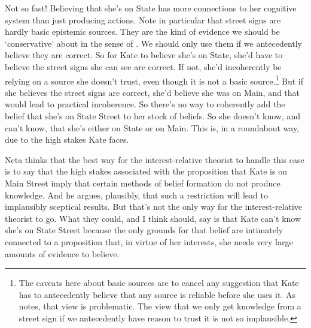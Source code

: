 Not so fast! Believing that she's on State has more connections to her cognitive system than just producing actions. Note in particular that street signs are hardly basic epistemic sources. They are the kind of evidence we should be `conservative' about in the sense of \citet{Pryor2004-PRYWWW}. We should only use them if we antecedently believe they are correct. So for Kate to believe she's on State, she'd have to believe the street signs she can see are correct. If not, she'd incoherently be relying on a source she doesn't trust, even though it is not a basic source.\footnote{The caveats here about basic sources are to cancel any suggestion that Kate has to antecedently believe that any source is reliable before she uses it. As \citet{Pryor2000-PRYTSA} notes, that view is problematic. The view that we only get knowledge from a street sign if we antecedently have reason to trust it is not so implausible.} But if she believes the street signs are correct, she'd believe she was on Main, and that would lead to practical incoherence. So there's no way to coherently add the belief that she's on State Street to her stock of beliefs. So she doesn't know, and can't know, that she's either on State or on Main. This is, in a roundabout way, due to the high stakes Kate faces.


Neta thinks that the best way for the interest-relative theorist to handle this case is to say that the high stakes associated with the proposition that Kate is on Main Street imply that certain methods of belief formation do not produce knowledge. And he argues, plausibly, that such a restriction will lead to implausibly sceptical results. But that's not the only way for the interest-relative theorist to go. What they could, and I think should, say is that Kate can't know she's on State Street because the only grounds for that belief are intimately connected to a proposition that, in virtue of her interests, she needs very large amounts of evidence to believe.

